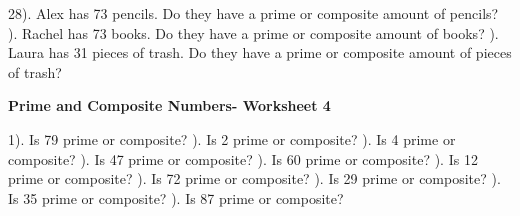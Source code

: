 \documentclass{article}%
\begin{document}
28). Alex has 73 pencils. Do they have a prime or composite amount of pencils?%
\newline%
\newline%
). Rachel has 73 books. Do they have a prime or composite amount of books?%
\newline%
\newline%
). Laura has 31 pieces of trash. Do they have a prime or composite amount of pieces of trash?%
\newline%
\newline%
\newline%
\pagebreak%
\large%
\begin{center}%
\textbf{Prime and Composite Numbers- Worksheet 4}%
\newline%
\end{center} \normalsize%
1). Is 79 prime or composite?%
\newline%
\newline%
). Is 2 prime or composite?%
\newline%
\newline%
). Is 4 prime or composite?%
\newline%
\newline%
). Is 47 prime or composite?%
\newline%
\newline%
). Is 60 prime or composite?%
\newline%
\newline%
). Is 12 prime or composite?%
\newline%
\newline%
). Is 72 prime or composite?%
\newline%
\newline%
). Is 29 prime or composite?%
\newline%
\newline%
). Is 35 prime or composite?%
\newline%
\newline%
). Is 87 prime or composite?%
\end{document}
